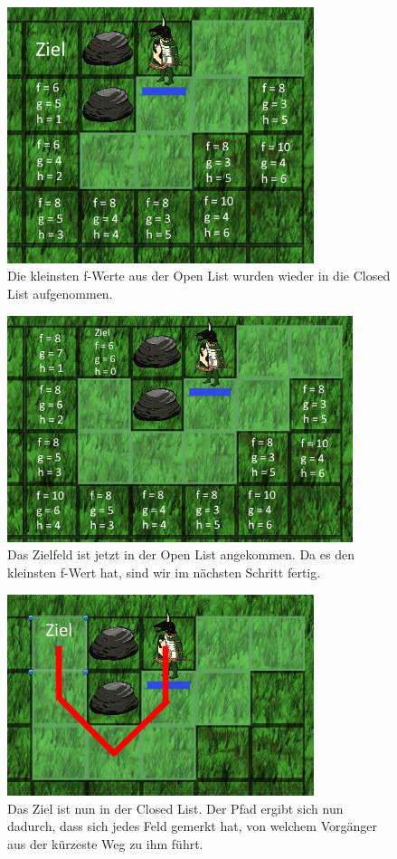 \documentclass[extern,palatino]{cgBA}
\begin{document}
\begin{figure}[H]
		\centering
		\includegraphics[width=0.8\textwidth]{pathfinding3.png}
		\caption{Die kleinsten f-Werte aus der Open List wurden wieder in die Closed List aufgenommen.}
		\label{pathfinding3}
\end{figure}
\begin{figure}[H]
		\centering
		\includegraphics[width=0.9\textwidth]{pathfinding4.png}
		\caption{Das Zielfeld ist jetzt in der Open List angekommen. Da es den kleinsten f-Wert hat, sind wir im nächsten Schritt fertig.}
		\label{pathfinding4}
\end{figure}
\begin{figure}[H]
		\centering
		\includegraphics[width=0.8\textwidth]{pathfinding5.png}
		\caption{Das Ziel ist nun in der Closed List. Der Pfad ergibt sich nun dadurch, dass sich jedes Feld gemerkt hat, von welchem Vorgänger aus der kürzeste Weg zu ihm führt.}
		\label{pathfinding5}
\end{figure}
\newpage
\end{document}
